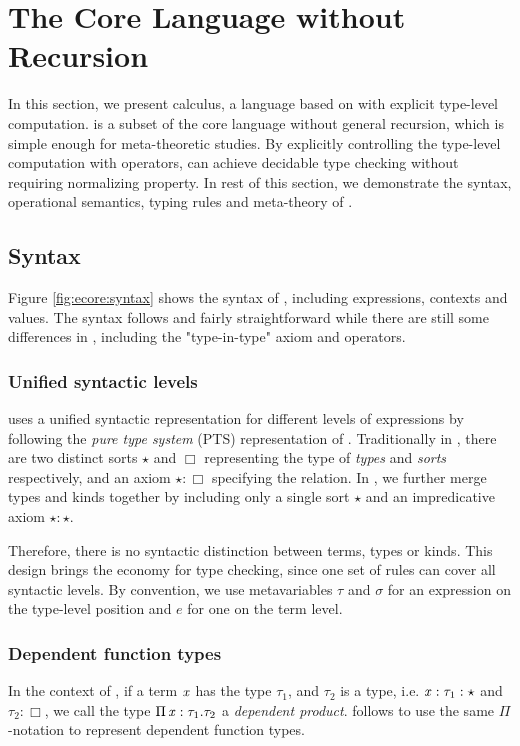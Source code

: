 \section{The Core Language without Recursion}\label{sec:ecore}

In this section, we present \ecore calculus, a language based on \cc with explicit type-level computation. \ecore is a subset of the core language \name without general recursion, which is simple enough for meta-theoretic studies. By explicitly controlling the type-level computation with \cast operators, \ecore can achieve decidable type checking without requiring normalizing property. In rest of this section, we demonstrate the syntax, operational semantics, typing rules and meta-theory of \ecore.

\subsection{Syntax}\label{sec:ecore:syn}
Figure \ref{fig:ecore:syntax} shows the syntax of \ecore, including expressions, contexts and values. The syntax follows \cc and fairly straightforward while there are still some differences in \ecore, including the "type-in-type" axiom and \cast operators.

\subsubsection{Unified syntactic levels}
\ecore uses a unified syntactic representation for different levels of expressions by following the \emph{pure type system} (PTS) representation of \cc. Traditionally in \cc, there are two distinct sorts $\star$ and $\Box$ representing the type of \emph{types} and \emph{sorts} respectively, and an axiom $\star:\Box$ specifying the relation. In \ecore, we further merge types and kinds together by including only a single sort $\star$ and an impredicative axiom $\star:\star$. 

Therefore, there is no syntactic distinction between terms, types or kinds. This design brings the economy for type checking, since one set of rules can cover all syntactic levels. By convention, we use metavariables $\tau$ and $\sigma$ for an expression on the type-level position and $e$ for one on the term level.

\subsubsection{Dependent function types}
In the context of \cc, if a term $\mathit{x}$ has the type $\tau_{{\mathrm{1}}}$, and $\tau_{{\mathrm{2}}}$ is a type, i.e. $\mathit{x}:\tau_{{\mathrm{1}}}:\star$ and $\tau_{{\mathrm{2}}}:\Box$, we call the type $\Pi \, \mathit{x}  :  \tau_{{\mathrm{1}}}  .  \tau_{{\mathrm{2}}}$ a \emph{dependent product}. \ecore follows \cc to use the same $ \Pi $-notation to represent dependent function types.

